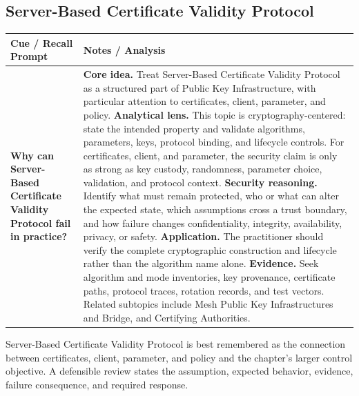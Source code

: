 \documentclass[11pt]{article}
\newcommand{\CornellHeader}{%
\rowcolor{Navy}\color{white}\bfseries Cue / Recall Prompt & \color{white}\bfseries Notes / Analysis\\\hline}
\newcommand{\CornellRow}[2]{%
\cellcolor{CueGray}\RaggedRight\textbf{#1} & \RaggedRight #2\\\hline}
\begin{document}
\subsection*{Server-Based Certificate Validity Protocol}
\begin{longtable}{>{\RaggedRight\arraybackslash}p{}|>{\RaggedRight\arraybackslash}p{}}
\CornellHeader
\CornellRow{Why can Server-Based Certificate Validity Protocol fail in practice?}{\textbf{Core idea.} Treat Server-Based Certificate Validity Protocol as a structured part of Public Key Infrastructure, with particular attention to certificates, client, parameter, and policy. \textbf{Analytical lens.} This topic is cryptography-centered: state the intended property and validate algorithms, parameters, keys, protocol binding, and lifecycle controls. For certificates, client, and parameter, the security claim is only as strong as key custody, randomness, parameter choice, validation, and protocol context. \textbf{Security reasoning.} Identify what must remain protected, who or what can alter the expected state, which assumptions cross a trust boundary, and how failure changes confidentiality, integrity, availability, privacy, or safety. \textbf{Application.} The practitioner should verify the complete cryptographic construction and lifecycle rather than the algorithm name alone. \textbf{Evidence.} Seek algorithm and mode inventories, key provenance, certificate paths, protocol traces, rotation records, and test vectors. Related subtopics include Mesh Public Key Infrastructures and Bridge, and Certifying Authorities.}
\end{longtable}
\begin{topicsummary}
Server-Based Certificate Validity Protocol is best remembered as the connection between certificates, client, parameter, and policy and the chapter's larger control objective. A defensible review states the assumption, expected behavior, evidence, failure consequence, and required response.
\end{topicsummary}
\end{document}
